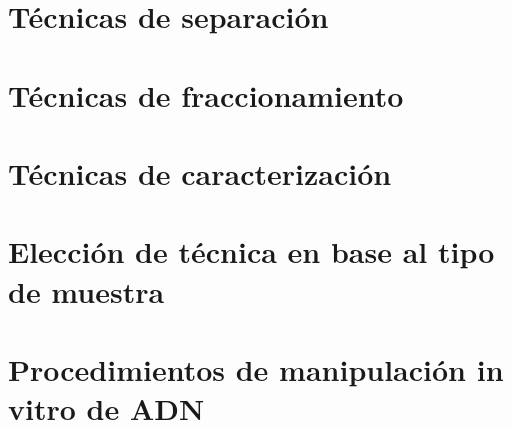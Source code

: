 


\section{Técnicas de separación}



\section{Técnicas de fraccionamiento}



\section{Técnicas de caracterización}



\section{Elección de técnica en base al tipo de muestra}



\section{Procedimientos de manipulación in vitro de ADN}

